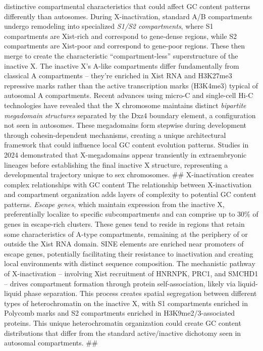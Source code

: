 \documentclass[
  a4paper,
  openany]{scrbook}
\begin{document}
distinctive compartmental characteristics that could affect GC content
patterns differently than autosomes. During X-inactivation, standard A/B
compartments undergo remodeling into specialized \emph{S1/S2
compartments}, where S1 compartments are Xist-rich and correspond to
gene-dense regions, while S2 compartments are Xist-poor and correspond
to gene-poor regions. These then merge to create the characteristic
``compartment-less'' superstructure of the inactive X. The inactive X's
A-like compartments differ fundamentally from classical A compartments
-- they're enriched in Xist RNA and H3K27me3 repressive marks rather
than the active transcription marks (H3K4me3) typical of autosomal A
compartments. Recent advances using micro-C and single-cell Hi-C
technologies have revealed that the X chromosome maintains distinct
\emph{bipartite megadomain structures} separated by the Dxz4 boundary
element, a configuration not seen in autosomes. These megadomains form
stepwise during development through cohesin-dependent mechanisms,
creating a unique architectural framework that could influence local GC
content evolution patterns. Studies in 2024 demonstrated that
X-megadomains appear transiently in extraembryonic lineages before
establishing the final inactive X structure, representing a
developmental trajectory unique to sex chromosomes. \#\# X-inactivation
creates complex relationships with GC content The relationship between
X-inactivation and compartment organization adds layers of complexity to
potential GC content patterns. \emph{Escape genes}, which maintain
expression from the inactive X, preferentially localize to specific
subcompartments and can comprise up to 30\% of genes in escape-rich
clusters. These genes tend to reside in regions that retain some
characteristics of A-type compartments, remaining at the periphery of or
outside the Xist RNA domain. SINE elements are enriched near promoters
of escape genes, potentially facilitating their resistance to
inactivation and creating local environments with distinct sequence
composition. The mechanistic pathway of X-inactivation -- involving Xist
recruitment of HNRNPK, PRC1, and SMCHD1 -- drives compartment formation
through protein self-association, likely via liquid-liquid phase
separation. This process creates spatial segregation between different
types of heterochromatin on the inactive X, with S1 compartments
enriched in Polycomb marks and S2 compartments enriched in
H3K9me2/3-associated proteins. This unique heterochromatin organization
could create GC content distributions that differ from the standard
active/inactive dichotomy seen in autosomal compartments. \#\#
\end{document}
